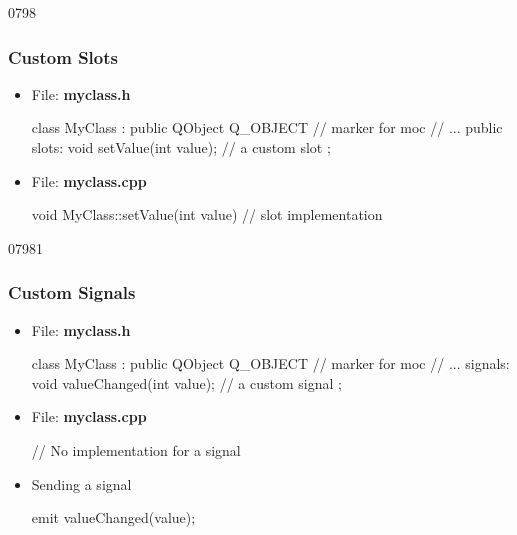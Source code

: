 \begin{slide}[fragile]{0798}\frametitle{Custom Slots}
 \label{codeForSlots1}
\begin{itemize}
\item File: \textbf{myclass.h} 
  \begin{cpp}
class MyClass : public QObject 
{
  Q_OBJECT // marker for moc
  // ...
public slots:
  void setValue(int value); // a custom slot
};
  \end{cpp}\medskip
\item File: \textbf{myclass.cpp}
  \begin{cpp}
void MyClass::setValue(int value) {
  // slot implementation
}
  \end{cpp}
\end{itemize}
\end{slide}


\begin{slide}[fragile]{07981}\frametitle{Custom Signals}
\label{codeForSignals1}
\begin{itemize}
\item File: \textbf{myclass.h} 
  \begin{cpp}
class MyClass : public QObject 
{
  Q_OBJECT // marker for moc                       
  // ...
signals:
  void valueChanged(int value); // a custom signal
};
  \end{cpp}
\item File: \textbf{myclass.cpp}
  \begin{cpp}
// No implementation for a signal

  \end{cpp}
\item Sending a signal
\begin{cpp}
emit valueChanged(value);
\end{cpp}
\end{itemize}


\end{slide}




